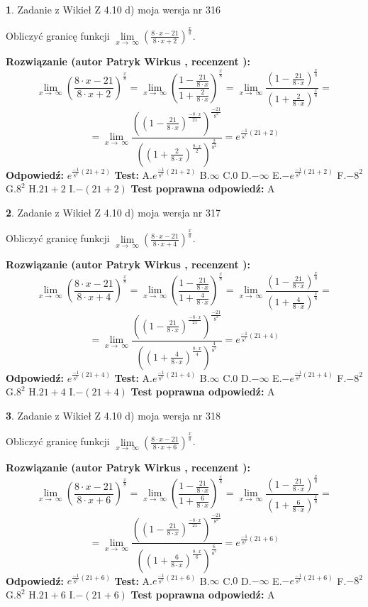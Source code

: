 \documentclass[12pt, a4paper]{article}
\theoremstyle{definition} %
\newtheorem{zad}{}
\newcommand{\zadStart}[1]{\begin{zad}#1\newline}
\newcommand{\zadStop}{\end{zad}}
\newcommand{\rozwStart}[2]{\noindent \textbf{Rozwiązanie (autor #1 , recenzent #2): }\newline}
\newcommand{\rozwStop}{\newline}
\newcommand{\odpStart}{\noindent \textbf{Odpowiedź:}\newline}
\newcommand{\odpStop}{\newline}
\newcommand{\testStart}{\noindent \textbf{Test:}\newline}
\newcommand{\testStop}{\newline}
\newcommand{\kluczStart}{\noindent \textbf{Test poprawna odpowiedź:}\newline}
\newcommand{\kluczStop}{\newline}
\begin{document}
\zadStart{Zadanie z Wikieł Z 4.10 d) moja wersja nr 316}


Obliczyć granicę funkcji  $\lim\limits_{x\to\ \infty}(\frac{8\cdot x-21}{8\cdot x+2})^{\frac{x}{8}}$.
\zadStop
\rozwStart{Patryk Wirkus}{}
$$\lim\limits_{x\to\ \infty}(\frac{8\cdot x-21}{8\cdot x+2})^{\frac{x}{8}} = \lim\limits_{x\to\ \infty}(\frac{1-\frac{21}{8\cdot x}}{1+\frac{2}{8\cdot x}})^{\frac{x}{8}}=\lim\limits_{x\to\ \infty}\frac{(1-\frac{21}{8\cdot x})^{\frac{x}{8}}}{(1+\frac{2}{8\cdot x})^{\frac{x}{8}}}=$$
$$=\lim\limits_{x\to\ \infty}\frac{((1-\frac{21}{8\cdot x})^{\frac{-8\cdot x}{21}})^{\frac{-21}{8^{2}}}}{((1+\frac{2}{8\cdot x})^{\frac{8\cdot x}{2}})^{\frac{2}{8^{2}}}}=e^{\frac{-1}{8^{2}}(21+2)}$$
\rozwStop
\odpStart
$e^{\frac{-1}{8^{2}}(21+2)}$
\odpStop
\testStart
A.$e^{\frac{-1}{8^{2}}(21+2)}$ B.$\infty$ C.$0$ D.$-\infty$ E.$-e^{\frac{-1}{8^{2}}(21+2)}$
F.$-8^{2}$ G.$8^{2}$
H.$21+2$
I.$-(21+2)$
\testStop
\kluczStart
A
\kluczStop



\zadStart{Zadanie z Wikieł Z 4.10 d) moja wersja nr 317}


Obliczyć granicę funkcji  $\lim\limits_{x\to\ \infty}(\frac{8\cdot x-21}{8\cdot x+4})^{\frac{x}{8}}$.
\zadStop
\rozwStart{Patryk Wirkus}{}
$$\lim\limits_{x\to\ \infty}(\frac{8\cdot x-21}{8\cdot x+4})^{\frac{x}{8}} = \lim\limits_{x\to\ \infty}(\frac{1-\frac{21}{8\cdot x}}{1+\frac{4}{8\cdot x}})^{\frac{x}{8}}=\lim\limits_{x\to\ \infty}\frac{(1-\frac{21}{8\cdot x})^{\frac{x}{8}}}{(1+\frac{4}{8\cdot x})^{\frac{x}{8}}}=$$
$$=\lim\limits_{x\to\ \infty}\frac{((1-\frac{21}{8\cdot x})^{\frac{-8\cdot x}{21}})^{\frac{-21}{8^{2}}}}{((1+\frac{4}{8\cdot x})^{\frac{8\cdot x}{4}})^{\frac{4}{8^{2}}}}=e^{\frac{-1}{8^{2}}(21+4)}$$
\rozwStop
\odpStart
$e^{\frac{-1}{8^{2}}(21+4)}$
\odpStop
\testStart
A.$e^{\frac{-1}{8^{2}}(21+4)}$ B.$\infty$ C.$0$ D.$-\infty$ E.$-e^{\frac{-1}{8^{2}}(21+4)}$
F.$-8^{2}$ G.$8^{2}$
H.$21+4$
I.$-(21+4)$
\testStop
\kluczStart
A
\kluczStop



\zadStart{Zadanie z Wikieł Z 4.10 d) moja wersja nr 318}


Obliczyć granicę funkcji  $\lim\limits_{x\to\ \infty}(\frac{8\cdot x-21}{8\cdot x+6})^{\frac{x}{8}}$.
\zadStop
\rozwStart{Patryk Wirkus}{}
$$\lim\limits_{x\to\ \infty}(\frac{8\cdot x-21}{8\cdot x+6})^{\frac{x}{8}} = \lim\limits_{x\to\ \infty}(\frac{1-\frac{21}{8\cdot x}}{1+\frac{6}{8\cdot x}})^{\frac{x}{8}}=\lim\limits_{x\to\ \infty}\frac{(1-\frac{21}{8\cdot x})^{\frac{x}{8}}}{(1+\frac{6}{8\cdot x})^{\frac{x}{8}}}=$$
$$=\lim\limits_{x\to\ \infty}\frac{((1-\frac{21}{8\cdot x})^{\frac{-8\cdot x}{21}})^{\frac{-21}{8^{2}}}}{((1+\frac{6}{8\cdot x})^{\frac{8\cdot x}{6}})^{\frac{6}{8^{2}}}}=e^{\frac{-1}{8^{2}}(21+6)}$$
\rozwStop
\odpStart
$e^{\frac{-1}{8^{2}}(21+6)}$
\odpStop
\testStart
A.$e^{\frac{-1}{8^{2}}(21+6)}$ B.$\infty$ C.$0$ D.$-\infty$ E.$-e^{\frac{-1}{8^{2}}(21+6)}$
F.$-8^{2}$ G.$8^{2}$
H.$21+6$
I.$-(21+6)$
\testStop
\kluczStart
A
\kluczStop
\end{document}
